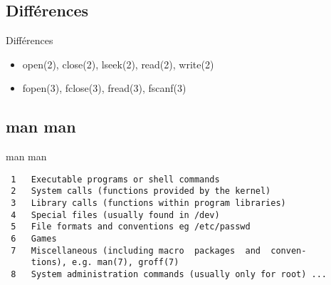 \begin{frame}[containsverbatim]{\sectitle}
\def\subsectitle{Différences}
\subsection{\subsectitle}
\begin{block}{\subsectitle}
\begin{itemize}
    \item open(2), close(2), lseek(2), read(2), write(2)
    \item fopen(3), fclose(3), fread(3), fscanf(3)
\end{itemize}
\end{block}

\def\subsectitle{man man}
\subsection{\subsectitle}
\begin{exampleblock}{\subsectitle}
\begin{verbatim}
 1   Executable programs or shell commands
 2   System calls (functions provided by the kernel)
 3   Library calls (functions within program libraries)
 4   Special files (usually found in /dev)
 5   File formats and conventions eg /etc/passwd
 6   Games
 7   Miscellaneous (including macro  packages  and  conven-
     tions), e.g. man(7), groff(7)
 8   System administration commands (usually only for root) ...
\end{verbatim}
\end{exampleblock}
\end{frame}


